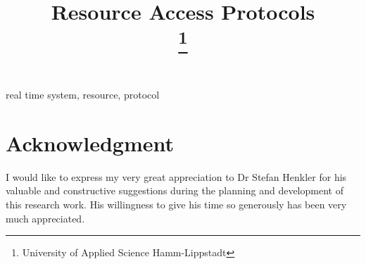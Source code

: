 \documentclass[conference]{IEEEtran}
\begin{document}
\title{Resource Access Protocols\\
{\footnotesize }
\thanks{University of Applied Science Hamm-Lippstadt}
}

\author{

}

\maketitle


\begin{IEEEkeywords}
real time system, resource, protocol 
\end{IEEEkeywords}














\section*{Acknowledgment}

I would like to express my very great appreciation to Dr Stefan Henkler  for his valuable and constructive suggestions during the planning and development of this research work. His willingness to give his time so generously has been very much appreciated.
\end{document}
